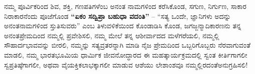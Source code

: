 \vskip 2pt

ನಮ್ಮ ಪೂರ್ವಿಕರಿಂದ ಶಿವ, ಶಕ್ತಿ, ಗಣಪತಿಗಳೆಂಬ ಅನಂತ ನಾಮಗಳಿಂದ ಕರೆಸಿಕೊಂಡ, ಸಗುಣ, ನಿರ್ಗುಣ, ಸಾಕಾರ ನಿರಾಕಾರನೆಂದು ಪೂಜೆಗೊಂಡ \textbf{“ಏಕಂ ಸದ್ವಿಪ್ರಾ ಬಹುಧಾ ವದಂತಿ”} – “ಸತ್ಯ ಒಂದೇ, ಜ್ಞಾನಿಗಳು ಅದನ್ನು ಅನಂತನಾಮಗಳಿಂದ ಸ್ತುತಿಸುವರು” ಎಂಬ ತಿಳುವಳಿಕೆಯಿಂದ ಕೊಂಡಾಡಿಸಿ ಕೊಂಡ, ಜಗಜ್ಜನ್ಮಾದಿಕಾರಣನು ತನ್ನ ಅನಂತಪ್ರೇಮದಿಂದ ನಮ್ಮಲ್ಲಿ ಪ್ರವೇಶಿಸಲಿ, ನಮ್ಮ ಮೇಲೆ ತನ್ನ ಆಶೀರ್ವಾದದ ಮಳೆಗರೆಯಲಿ, ನಮ್ಮಲ್ಲಿ ಸೌಹಾರ್ದಭಾವವನ್ನು ಬೀರಲಿ, ನಮ್ಮನ್ನು ಸತ್ಯವ್ರತರನ್ನಾಗಿ ಮಾಡಿ ನೈಜ ಪ್ರೇಮದಿಂದ ಒಬ್ಬರಿಗೊಬ್ಬರು ನೆರವಾಗುವಂತೆ ಮಾಡಲಿ, ನಮ್ಮ ಭಾರತಭೂಮಿಯ ಧಾರ್ಮಿಕ ಜೀವನೋದ್ಧಾರದ ಈ ಮಹತ್ಕಾರ್ಯಕ್ರಮದಲ್ಲಿ ಸ್ವಂತ ಕೀರ್ತಿಗಾಗಲೀ ಸ್ವಪ್ರತಿಷ್ಠೆಗಾಗಲೀ, ಅಥವಾ ವೈಯಕ್ತಿಕಲಾಭಕ್ಕಾಗಲೀ ಮಾಡುವ ಆಶೆಯು ಲೇಶಾಂಶವೂ ನಮ್ಮಲ್ಲಿರದಂತೆ\break ಅನುಗ್ರಹಿಸಲಿ!

